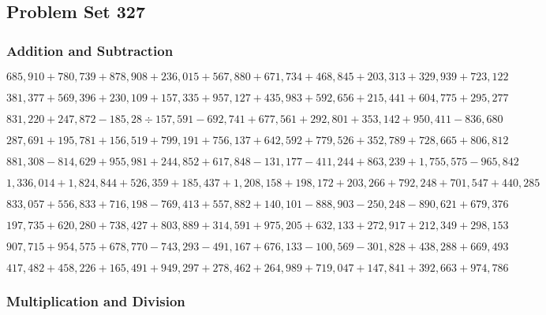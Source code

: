 \hypertarget{problem-set-327}{%
\subsection{Problem Set 327}\label{problem-set-327}}

\hypertarget{addition-and-subtraction}{%
\subsubsection{Addition and
Subtraction}\label{addition-and-subtraction}}

\(685,910+780,739+878,908+236,015+567,880+671,734+468,845+203,313+329,939+723,122\)

\(381,377+569,396+230,109+157,335+957,127+435,983+592,656+215,441+604,775+295,277\)

\(831,220+247,872-185,28÷157,591-692,741+677,561+292,801+353,142+950,411-836,680\)

\(287,691+195,781+156,519+799,191+756,137+642,592+779,526+352,789+728,665+806,812\)

\(881,308-814,629+955,981+244,852+617,848-131,177-411,244+863,239+1,755,575-965,842\)

\(1,336,014+1,824,844+526,359+185,437+1,208,158+198,172+203,266+792,248+701,547+440,285\)

\(833,057+556,833+716,198-769,413+557,882+140,101-888,903-250,248-890,621+679,376\)

\(197,735+620,280+738,427+803,889+314,591+975,205+632,133+272,917+212,349+298,153\)

\(907,715+954,575+678,770-743,293-491,167+676,133-100,569-301,828+438,288+669,493\)

\(417,482+458,226+165,491+949,297+278,462+264,989+719,047+147,841+392,663+974,786\)

\hypertarget{multiplication-and-division}{%
\subsubsection{Multiplication and
Division}\label{multiplication-and-division}}


